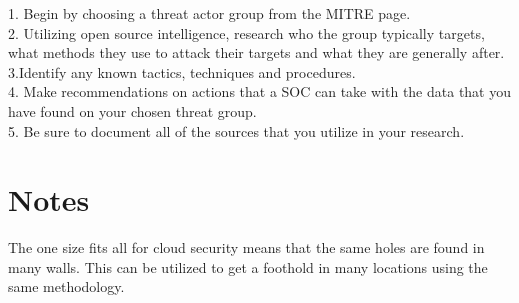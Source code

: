 \documentclass[
	letterpaper, %
	10pt, %
	unnumberedsections, %
	twoside, %
]{APAAssignment}
\begin{document}
1. Begin by choosing a threat actor group from the MITRE page.\\
2. Utilizing open source intelligence, research who the group typically targets, what methods they use to attack their targets and what they are generally after.\\
3.Identify any known tactics, techniques and procedures.\\
4. Make recommendations on actions that a SOC can take with the data that you have found on your chosen threat group. \\
5. Be sure to document all of the sources that you utilize in your research. \\


\section{Notes}
The one size fits all for cloud security means that the same holes are found in many walls. This can be utilized to get a foothold in many locations using the same methodology.











%


\printbibliography %





\appendix


\clearpage
\end{document}
